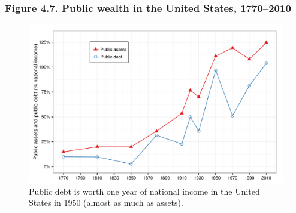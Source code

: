 \documentclass[t]{beamer}\usepackage[]{graphicx}\usepackage[]{color}
\newenvironment{knitrout}{}{} %
\begin{document}
\begin{frame}[label=Figure_4_7]
\frametitle{Figure 4.7. Public wealth in the United States, 1770--2010}
\begin{figure}[t]
\begin{minipage}[b]{\textwidth}
\centering
\begin{knitrout}\footnotesize
{}\color{fgcolor}

{\centering \includegraphics[width=1\linewidth]{figures/color/Figure_4_7} 

}



\end{knitrout}
\caption{Public debt is worth one year of national income in the United States in 1950 (almost as much as assets).}
\end{minipage}
\end{figure}
\end{frame}
\end{document}
